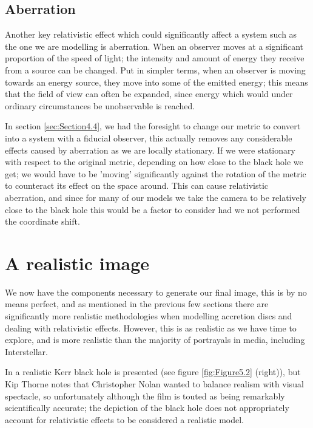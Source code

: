 \documentclass[oneside,openright,frontopenright, singlespacing]{dmathesis}
\begin{document}
\subsection{Aberration}\label{subsec:Subsection5.2.2}

	Another key relativistic effect which could significantly affect a system such as the one we are modelling is aberration. When an observer moves at a significant proportion of the speed of light; the intensity and amount of energy they receive from a source can be changed. Put in simpler terms, when an observer is moving towards an energy source, they move into some of the emitted energy; this means that the field of view can often be expanded, since energy which would under ordinary circumstances be unobservable is reached.

\vspace{1em}
	In section \ref{sec:Section4.4}, we had the foresight to change our metric to convert into a system with a fiducial observer, this actually removes any considerable effects caused by aberration as we are locally stationary. If we were stationary with respect to the original metric, depending on how close to the black hole we get; we would have to be 'moving' significantly against the rotation of the metric to counteract its effect on the space around. This can cause relativistic aberration, and since for many of our models we take the camera to be relatively close to the black hole this would be a factor to consider had we not performed the coordinate shift.

\section{A realistic image}\label{sec:Section5.3}

	We now have the components necessary to generate our final image, this is by no means perfect, and as mentioned in the previous few sections there are significantly more realistic methodologies when modelling accretion discs and dealing with relativistic effects. However, this is as realistic as we have time to explore, and is more realistic than the majority of portrayals in media, including Interstellar. 

\vspace{1em}
	In \cite{thorne2015gravitational} a realistic Kerr black hole is presented (see figure \ref{fig:Figure5.2} (right)), but Kip Thorne notes that Christopher Nolan wanted to balance realism with visual spectacle, so unfortunately although the film is touted as being remarkably scientifically accurate; the depiction of the black hole does not appropriately account for relativistic effects to be considered a realistic model.
\end{document}
